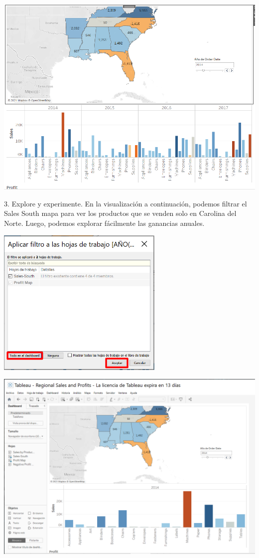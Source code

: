 \documentclass[12pt,letterpaper]{article}
\begin{document}
\begin{center}
    \includegraphics[width=16cm]{img/55.png}  
\end{center}
3. Explore y experimente. En la visualización a continuación, podemos filtrar el Sales
South mapa para ver los productos que se venden solo en Carolina del Norte. Luego, podemos
explorar fácilmente las ganancias anuales.
\begin{center}
    \includegraphics[width=8cm]{img/56.png}  
\end{center}
\begin{center}
    \includegraphics[width=16cm]{img/57.png}  
\end{center}
\end{document}
